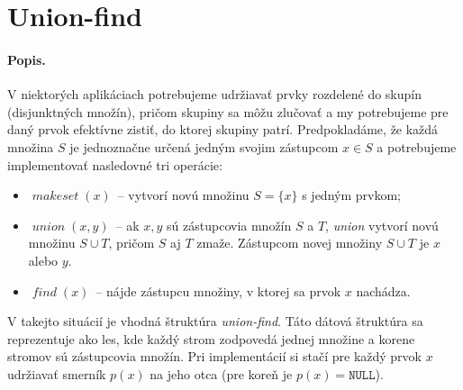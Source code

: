 \def\null{\texttt{NULL}}
\def\makeset{$\mathop{\mathit{makeset}}(x)$}
\def\find{$\mathop{\mathit{find}}(x)$}
\def\union{$\mathop{\mathit{union}}(x, y)$}

\section{Union-find}

\paragraph{Popis.}

V niektorých aplikáciach potrebujeme udržiavať prvky rozdelené do skupín
(disjunktných množín), pričom skupiny sa môžu zlučovať a my potrebujeme
pre daný prvok efektívne zistiť, do ktorej skupiny patrí. Predpokladáme,
že každá množina $S$ je jednoznačne určená jedným svojim zástupcom $x\in S$
a potrebujeme implementovať nasledovné tri operácie:

\begin{itemize}
\item \makeset\ -- vytvorí novú množinu $S=\{x\}$ s jedným prvkom; %
\item \union\ -- ak $x,y$ sú zástupcovia množín $S$ a $T$,
                 {\it union} vytvorí novú množinu $S\cup T$,
                 pričom $S$ aj $T$ zmaže. Zástupcom novej množiny $S\cup T$
                 je $x$ alebo $y$.
\item \find\ -- nájde zástupcu množiny, v ktorej sa 
                prvok $x$ nachádza.
\end{itemize}

V takejto situácií je vhodná štruktúra \emph{union-find}.
Táto dátová štruktúra sa reprezentuje ako les, kde každý strom zodpovedá
jednej množine a korene stromov sú zástupcovia množín. Pri implementácií si
stačí pre každý prvok $x$ udržiavať smerník $p(x)$ na jeho otca
(pre koreň je $p(x)=\null$).

